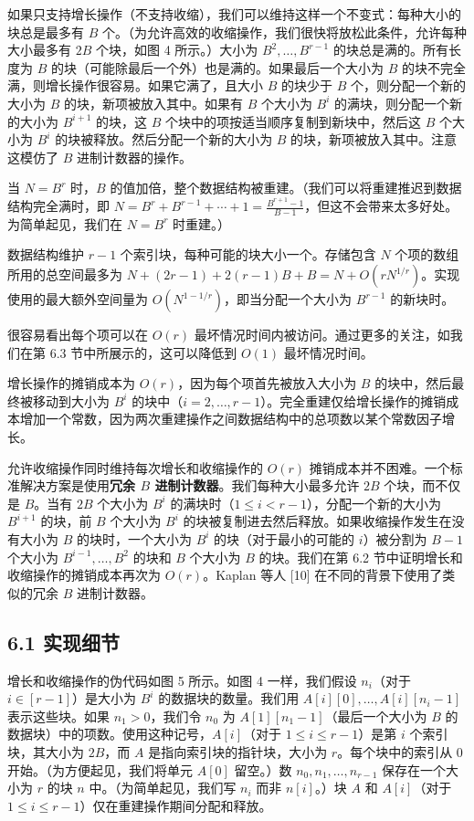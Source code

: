 \documentclass[12pt,a4paper]{ctexart}
\theoremstyle{remark}
\begin{document}
如果只支持增长操作（不支持收缩），我们可以维持这样一个不变式：每种大小的块总是最多有 $B$ 个。（为允许高效的收缩操作，我们很快将放松此条件，允许每种大小最多有 $2B$ 个块，如图 4 所示。）大小为 $B^2,\ldots,B^{r-1}$ 的块总是满的。所有长度为 $B$ 的块（可能除最后一个外）也是满的。如果最后一个大小为 $B$ 的块不完全满，则增长操作很容易。如果它满了，且大小 $B$ 的块少于 $B$ 个，则分配一个新的大小为 $B$ 的块，新项被放入其中。如果有 $B$ 个大小为 $B^i$ 的满块，则分配一个新的大小为 $B^{i+1}$ 的块，这 $B$ 个块中的项按适当顺序复制到新块中，然后这 $B$ 个大小为 $B^i$ 的块被释放。然后分配一个新的大小为 $B$ 的块，新项被放入其中。注意这模仿了 $B$ 进制计数器的操作。

当 $N=B^r$ 时，$B$ 的值加倍，整个数据结构被重建。（我们可以将重建推迟到数据结构完全满时，即 $N=B^r+B^{r-1}+\cdots+1=\frac{B^{r+1}-1}{B-1}$，但这不会带来太多好处。为简单起见，我们在 $N=B^r$ 时重建。）

数据结构维护 $r-1$ 个索引块，每种可能的块大小一个。存储包含 $N$ 个项的数组所用的总空间最多为 $N+(2r-1)+2(r-1)B+B=N+O(rN^{1/r})$。实现使用的最大额外空间量为 $O(N^{1-1/r})$，即当分配一个大小为 $B^{r-1}$ 的新块时。

很容易看出每个项可以在 $O(r)$ 最坏情况时间内被访问。通过更多的关注，如我们在第 6.3 节中所展示的，这可以降低到 $O(1)$ 最坏情况时间。

增长操作的摊销成本为 $O(r)$，因为每个项首先被放入大小为 $B$ 的块中，然后最终被移动到大小为 $B^i$ 的块中（$i=2,\ldots,r-1$）。完全重建仅给增长操作的摊销成本增加一个常数，因为两次重建操作之间数据结构中的总项数以某个常数因子增长。

允许收缩操作同时维持每次增长和收缩操作的 $O(r)$ 摊销成本并不困难。一个标准解决方案是使用\textbf{冗余 $B$ 进制计数器}。我们每种大小最多允许 $2B$ 个块，而不仅是 $B$。当有 $2B$ 个大小为 $B^i$ 的满块时（$1\leq i<r-1$），分配一个新的大小为 $B^{i+1}$ 的块，前 $B$ 个大小为 $B^i$ 的块被复制进去然后释放。如果收缩操作发生在没有大小为 $B$ 的块时，一个大小为 $B^i$ 的块（对于最小的可能的 $i$）被分割为 $B-1$ 个大小为 $B^{i-1},\ldots,B^2$ 的块和 $B$ 个大小为 $B$ 的块。我们在第 6.2 节中证明增长和收缩操作的摊销成本再次为 $O(r)$。Kaplan 等人 [10] 在不同的背景下使用了类似的冗余 $B$ 进制计数器。

\subsection{6.1 实现细节}

增长和收缩操作的伪代码如图 5 所示。如图 4 一样，我们假设 $n_i$（对于 $i\in[r-1]$）是大小为 $B^i$ 的数据块的数量。我们用 $A[i][0],\ldots,A[i][n_i-1]$ 表示这些块。如果 $n_1>0$，我们令 $n_0$ 为 $A[1][n_1-1]$（最后一个大小为 $B$ 的数据块）中的项数。使用这种记号，$A[i]$（对于 $1\leq i\leq r-1$）是第 $i$ 个索引块，其大小为 $2B$，而 $A$ 是指向索引块的指针块，大小为 $r$。每个块中的索引从 0 开始。（为方便起见，我们将单元 $A[0]$ 留空。）数 $n_0,n_1,\ldots,n_{r-1}$ 保存在一个大小为 $r$ 的块 $n$ 中。（为简单起见，我们写 $n_i$ 而非 $n[i]$。）块 $A$ 和 $A[i]$（对于 $1\leq i\leq r-1$）仅在重建操作期间分配和释放。
\end{document}
